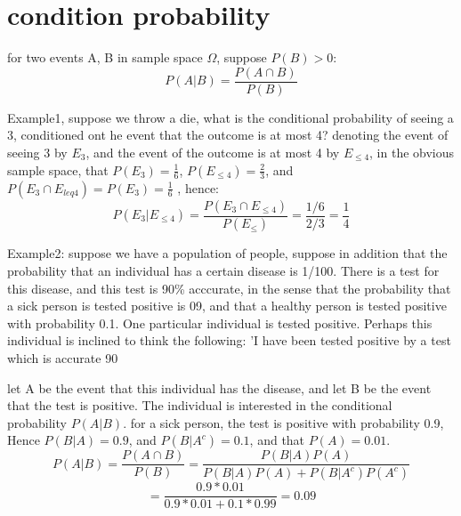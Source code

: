 \documentclass[4apaper,12pt]{book}
\begin{document}
  \section{condition probability}
  \begin{description}
  \item for two events A, B in sample space $\Omega$, suppose $P(B) > 0$:
    \begin{equation} P(A|B)=\frac{P(A \cap B)}{P(B)} \end{equation}
  \item Example1, suppose we throw a die, what is the conditional probability of seeing a 3, conditioned ont he event that the outcome is at most 4? denoting the event of seeing 3 by $E_3$, and the event of the outcome is at most 4 by $E_{\leq{4}}$, in the obvious sample space, that $P(E_3)=\frac{1}{6}$, $P(E_{\leq{4}})=\frac{2}{3}$, and $P(E_3 \cap {E_{leq{4}}})=P(E_3)=\frac{1}{6}$ , hence:
    \begin{equation}
      P(E_3|E_{\leq4}) = \frac{P(E_3 \cap E_{\leq4})}{P(E_{\leq})} = \frac{1/6}{2/3} = \frac{1}{4}
    \end{equation}
  \item Example2: suppose we have a population of people, suppose in addition that the probability that an individual has a certain disease is 1/100. There is a test for this disease, and this test is 90\% acccurate, in the sense that the probability that a sick person is tested positive is 09, and that a healthy person is tested positive with probability 0.1. One particular individual is tested positive. Perhaps this individual is inclined to think the following: 'I have been tested positive by a test which is accurate 90%
  \item let A be the event that this individual has the disease, and let B be the event that the test is positive. The individual is interested in the conditional probability $P(A|B)$. for a sick person, the test is positive with probability 0.9, Hence $P(B|A)=0.9$, and $P(B|A^c)=0.1$, and that $P(A) =0.01$.
    \begin{equation}
      P(A|B) = \frac{P(A\cap{B})}{P(B)} = \frac{P(B|A)P(A)}{P(B|A)P(A) + P(B|A^c)P(A^c)}
    \end{equation}
    \begin{equation}
      = \frac{0.9*0.01}{0.9*0.01+0.1*0.99} = 0.09
      \end{equation}
    \end{description}
\end{document}
